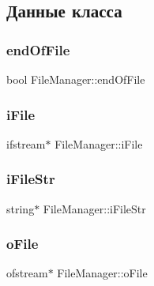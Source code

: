 \subsection{Данные класса}
\hypertarget{class_file_manager_ae43001594f1ee182581741d2530620a8}{}\label{class_file_manager_ae43001594f1ee182581741d2530620a8} 
\subsubsection{\texorpdfstring{end\+Of\+File}{endOfFile}}
{\footnotesize\ttfamily bool File\+Manager\+::end\+Of\+File\hspace{0.3cm}{\ttfamily [private]}}

\hypertarget{class_file_manager_a91fd33cbb230ed4974a678302e906a8d}{}\label{class_file_manager_a91fd33cbb230ed4974a678302e906a8d} 
\subsubsection{\texorpdfstring{i\+File}{iFile}}
{\footnotesize\ttfamily ifstream$\ast$ File\+Manager\+::i\+File\hspace{0.3cm}{\ttfamily [private]}}

\hypertarget{class_file_manager_aaa0e6feed45b6a92ce5c0b509bd9ceb6}{}\label{class_file_manager_aaa0e6feed45b6a92ce5c0b509bd9ceb6} 
\subsubsection{\texorpdfstring{i\+File\+Str}{iFileStr}}
{\footnotesize\ttfamily string$\ast$ File\+Manager\+::i\+File\+Str\hspace{0.3cm}{\ttfamily [private]}}

\hypertarget{class_file_manager_afe31c07e311212814e4a8ba01c7436a1}{}\label{class_file_manager_afe31c07e311212814e4a8ba01c7436a1} 
\subsubsection{\texorpdfstring{o\+File}{oFile}}
{\footnotesize\ttfamily ofstream$\ast$ File\+Manager\+::o\+File\hspace{0.3cm}{\ttfamily [private]}}

